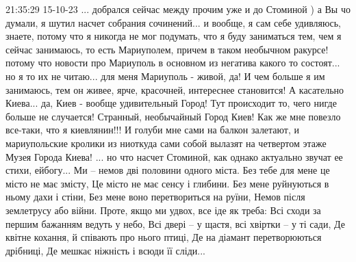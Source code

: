  
 
 
 
 

21:35:29 15-10-23
... добрался сейчас между прочим уже и до Стоминой ) а Вы чо думали, я шутил насчет собрания сочинений... и вообще, я сам себе удивляюсь, знаете, потому что я никогда не мог подумать, что я буду заниматься тем, чем я сейчас занимаюсь, то есть Мариуполем, причем в таком необычном ракурсе! потому что новости про Мариуполь в основном из негатива какого то состоят... но я то их не читаю... для меня Мариуполь - живой, да! И чем больше я им занимаюсь, тем он живее, ярче, красочней, интереснее становится! А касательно Киева... да,  Киев - вообще удивительный Город! Тут происходит то, чего нигде больше не случается! Странный, необычайный Город Киев! Как же мне повезло все-таки, что я киевлянин!!! И голуби мне сами на балкон залетают, и мариупольские кролики из ниоткуда сами собой вылазят на четвертом этаже Музея Города Киева! ... но что  насчет Стоминой, как однако актуально звучат ее стихи, ейбогу... Ми – немов дві половини одного міста.
Без тебе для мене це місто не має змісту,
Це місто не має сенсу і глибини.
Без мене руйнуються в ньому дахи і стіни,
Без мене воно перетвориться на руїни,
Немов після землетрусу або війни.
Проте, якщо ми удвох, все іде як треба:
Всі сходи за першим бажанням ведуть у небо,
Всі двері – у щастя, всі хвіртки – у ті сади,
Де квітне кохання, й співають про нього птиці,
Де на діамант перетворюються дрібниці,
Де мешкає ніжність і всюди її сліди...
